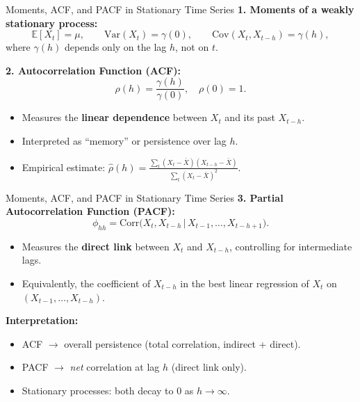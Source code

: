 \documentclass{beamer}
\begin{document}
\begin{frame}{Moments, ACF, and PACF in Stationary Time Series}
\small
\textbf{1. Moments of a weakly stationary process:}
\[
\mathbb{E}[X_t] = \mu, \qquad
\mathrm{Var}(X_t) = \gamma(0), \qquad
\mathrm{Cov}(X_t, X_{t-h}) = \gamma(h),
\]
where $\gamma(h)$ depends only on the lag $h$, not on $t$.

\pause
\textbf{2. Autocorrelation Function (ACF):}
\[
\rho(h) = \frac{\gamma(h)}{\gamma(0)}, \quad
\rho(0)=1.
\]
\begin{itemize}
    \item Measures the \textbf{linear dependence} between $X_t$ and its past $X_{t-h}$.
    \item Interpreted as “memory” or persistence over lag $h$.
    \item Empirical estimate: $\widehat\rho(h) = \frac{\sum_t (X_t-\bar X)(X_{t-h}-\bar X)}{\sum_t (X_t-\bar X)^2}$.
\end{itemize}
\end{frame}


\begin{frame}{Moments, ACF, and PACF in Stationary Time Series}
\small
\textbf{3. Partial Autocorrelation Function (PACF):}
\[
\phi_{hh} = \text{Corr}\big(X_t, X_{t-h} \,\big|\, X_{t-1}, \ldots, X_{t-h+1}\big).
\]
\begin{itemize}
    \item Measures the \textbf{direct link} between $X_t$ and $X_{t-h}$, 
          controlling for intermediate lags.
    \item Equivalently, the coefficient of $X_{t-h}$ in the best linear regression
          of $X_t$ on $(X_{t-1},\dots,X_{t-h})$.
\end{itemize}

\pause
\textbf{Interpretation:}
\begin{itemize}
    \item ACF $\to$ overall persistence (total correlation, indirect + direct).
    \item PACF $\to$ \emph{net} correlation at lag $h$ (direct link only).
    \item Stationary processes: both decay to 0 as $h \to \infty$.
\end{itemize}

\end{frame}
\end{document}
